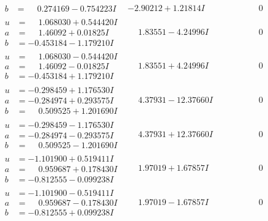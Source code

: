 \documentclass[1p]{elsarticle_modified}
\theoremstyle{definition}
\begin{document}
$$\begin{array}{c|c|c}
\begin{aligned}
b &= \phantom{-}0.274169 - 0.754223 I\end{aligned}
 & -2.90212 + 1.21814 I & \phantom{-0.000000 } 0 \\ \hline\begin{aligned}
u &= \phantom{-}1.068030 + 0.544420 I \\
a &= \phantom{-}1.46092 + 0.01825 I \\
b &= -0.453184 - 1.179210 I\end{aligned}
 & \phantom{-}1.83551 - 4.24996 I & \phantom{-0.000000 } 0 \\ \hline\begin{aligned}
u &= \phantom{-}1.068030 - 0.544420 I \\
a &= \phantom{-}1.46092 - 0.01825 I \\
b &= -0.453184 + 1.179210 I\end{aligned}
 & \phantom{-}1.83551 + 4.24996 I & \phantom{-0.000000 } 0 \\ \hline\begin{aligned}
u &= -0.298459 + 1.176530 I \\
a &= -0.284974 + 0.293575 I \\
b &= \phantom{-}0.509525 + 1.201690 I\end{aligned}
 & \phantom{-}4.37931 - 12.37660 I & \phantom{-0.000000 } 0 \\ \hline\begin{aligned}
u &= -0.298459 - 1.176530 I \\
a &= -0.284974 - 0.293575 I \\
b &= \phantom{-}0.509525 - 1.201690 I\end{aligned}
 & \phantom{-}4.37931 + 12.37660 I & \phantom{-0.000000 } 0 \\ \hline\begin{aligned}
u &= -1.101900 + 0.519411 I \\
a &= \phantom{-}0.959687 + 0.178430 I \\
b &= -0.812555 - 0.099238 I\end{aligned}
 & \phantom{-}1.97019 + 1.67857 I & \phantom{-0.000000 } 0 \\ \hline\begin{aligned}
u &= -1.101900 - 0.519411 I \\
a &= \phantom{-}0.959687 - 0.178430 I \\
b &= -0.812555 + 0.099238 I\end{aligned}
 & \phantom{-}1.97019 - 1.67857 I & \phantom{-0.000000 } 0 \\ \hline\begin{aligned}

\end{aligned}
\end{array}$$
\end{document}
